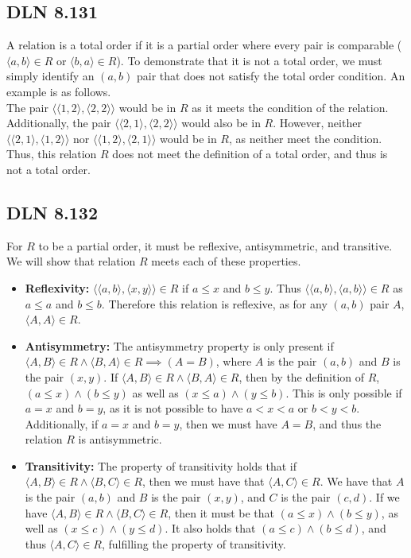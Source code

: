 \documentclass[titlepage]{article}
\begin{document}
\subsection{DLN 8.131}

A relation is a total order if it is a partial order where every pair is comparable ($\langle a,b \rangle \in R$ or $\langle b,a \rangle \in R$). To demonstrate that it is not a total order, we must simply identify an $(a,b)$ pair that does not satisfy the total order condition. An example is as follows.\\
The pair $\langle \langle 1,2 \rangle , \langle 2,2 \rangle \rangle$ would be in $R$ as it meets the condition of the relation. Additionally, the pair $\langle \langle 2,1 \rangle , \langle 2,2 \rangle \rangle$ would also be in $R$. However, neither $\langle \langle 2,1 \rangle , \langle 1,2 \rangle \rangle$ nor $\langle \langle 1,2 \rangle , \langle 2,1 \rangle \rangle$ would be in $R$, as neither meet the condition. Thus, this relation $R$ does not meet the definition of a total order, and thus is not a total order.

\subsection{DLN 8.132}

For $R$ to be a partial order, it must be reflexive, antisymmetric, and transitive. We will show that relation $R$ meets each of these properties.
 
\begin{itemize}
\item \textbf{Reflexivity:} $\langle \langle a,b \rangle , \langle x,y \rangle \rangle \in R$ if $a \leq x$ and $b \leq y$. Thus $\langle \langle a,b \rangle , \langle a,b \rangle \rangle \in R$ as $a \leq a$ and $b \leq b$. Therefore this relation is reflexive, as for any $(a,b)$ pair $A$, $\langle A,A \rangle \in R$.
\item \textbf{Antisymmetry:} The antisymmetry property is only present if $\langle A,B \rangle \in R \land \langle B,A \rangle \in R \implies (A=B)$, where $A$ is the pair $(a,b)$ and $B$ is the pair $(x,y)$. If $\langle A,B \rangle \in R \land \langle B,A \rangle \in R$, then by the definition of $R$, $(a \leq x) \land (b \leq y)$ as well as $(x \leq a) \land (y \leq b)$. This is only possible if $a=x$ and $b=y$, as it is not possible to have $a < x < a$ or $b < y < b$. Additionally, if $a=x$ and $b=y$, then we must have $A=B$, and thus the relation $R$ is antisymmetric. 
\item \textbf{Transitivity:} The property of transitivity holds that if $\langle A,B \rangle \in R \land \langle B,C \rangle \in R$, then we must have that $\langle A,C \rangle \in R$. We have that $A$ is the pair $(a,b)$ and $B$ is the pair $(x,y)$, and $C$ is the pair $(c,d)$. If we have $\langle A,B \rangle \in R \land \langle B,C \rangle \in R$, then it must be that $(a \leq x) \land (b \leq y)$, as well as $(x \leq c) \land (y \leq d)$. It also holds that $(a \leq c) \land (b \leq d)$, and thus $\langle A,C \rangle \in R$, fulfilling the property of transitivity.
\end{itemize}
\end{document}
